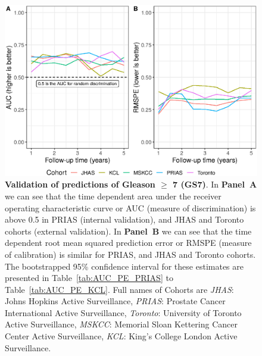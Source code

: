 \begin{figure}
\centerline{\includegraphics[width=\columnwidth]{images/auc_pe.eps}}
\caption{\textbf{Validation of predictions of Gleason $\geq$ 7 (GS7)}. In \textbf{Panel~A} we can see that the time dependent area under the receiver operating characteristic curve or AUC (measure of discrimination) is above 0.5 in PRIAS (internal validation), and JHAS and Toronto cohorts (external validation). In \textbf{Panel~B} we can see that the time dependent root mean squared prediction error or RMSPE (measure of calibration) is similar for PRIAS, and JHAS and Toronto cohorts. The bootstrapped 95\% confidence interval for these estimates are presented in Table~\ref{tab:AUC_PE_PRIAS} to Table~\ref{tab:AUC_PE_KCL}. Full names of Cohorts are \textit{JHAS}: Johns Hopkins Active Surveillance, \textit{PRIAS}: Prostate Cancer International Active Surveillance, \textit{Toronto}: University of Toronto Active Surveillance, \textit{MSKCC}: Memorial Sloan Kettering Cancer Center Active Surveillance, \textit{KCL}: King's College London Active Surveillance.}
\label{fig:auc_pe}
\end{figure}

